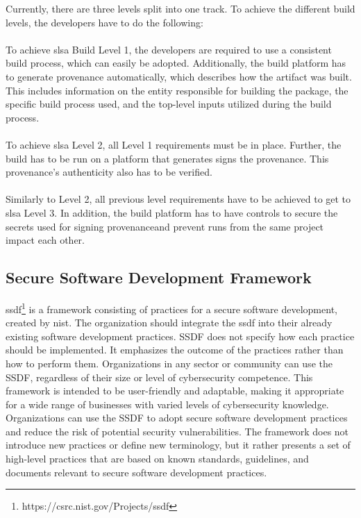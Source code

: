 Currently, there are three levels split into one track. To achieve the different build levels, the developers have to do the following:
\\~\\
To achieve \acrshort{slsa} Build Level 1, the developers are required to use a consistent build process, which can easily be adopted. Additionally, the build platform has to generate \gls{provenance} automatically, which describes how the artifact was built. This includes information on the entity responsible for building the package, the specific build process used, and the top-level inputs utilized during the build process.
\\~\\
To achieve \acrshort{slsa} Level 2, all Level 1 requirements must be in place. Further, the build has to be run on a platform that generates signs the \gls{provenance}. This \gls{provenance}'s authenticity also has to be verified.
\\~\\
Similarly to Level 2, all previous level requirements have to be achieved to get to \acrshort{slsa} Level 3. In addition, the build platform has to have controls to secure the secrets used for signing \gls{provenance}and prevent runs from the same project impact each other. 


\subsection{Secure Software Development Framework}
\acrlong{ssdf}\footnote{https://csrc.nist.gov/Projects/ssdf} is a framework consisting of practices for a secure software development, created by \acrlong{nist}. The organization should integrate the \acrshort{ssdf} into their already existing software development practices. SSDF does not specify how each practice should be implemented. It emphasizes the outcome of the practices rather than how to perform them. Organizations in any sector or community can use the SSDF, regardless of their size or level of cybersecurity competence. This framework is intended to be user-friendly and adaptable, making it appropriate for a wide range of businesses with varied levels of cybersecurity knowledge. Organizations can use the SSDF to adopt secure software development practices and reduce the risk of potential security vulnerabilities. The framework does not introduce new practices or define new terminology, but it rather presents a set of high-level practices that are based on known standards, guidelines, and documents relevant to secure software development practices. 

